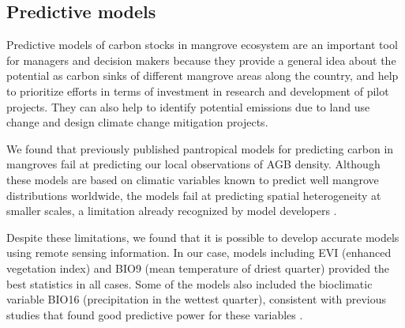 \documentclass[review, authoryear]{elsarticle}   	%
\begin{document}
\subsection{Predictive models}
Predictive models of carbon stocks in mangrove ecosystem are an important tool for managers and decision makers because they provide a general idea about the potential as carbon sinks of different mangrove areas along the country, and help to prioritize efforts in terms of investment in research and development of pilot projects. They can also help to identify potential emissions due to land use change and design climate change mitigation projects. 

We found that previously published pantropical models for predicting carbon in mangroves fail at predicting our local observations of AGB density. Although these models are based on climatic variables known to predict well mangrove distributions worldwide, the models fail at predicting spatial heterogeneity at smaller scales, a limitation already recognized by model developers  \citep{CONL:CONL12060}.


Despite these limitations, we found that it is possible to develop accurate models using remote sensing information. In our case, models including EVI (enhanced vegetation index) and BIO9 (mean temperature of driest quarter) provided the best statistics in all cases. Some of the models also included the bioclimatic variable BIO16 (precipitation in the wettest quarter), consistent with previous studies that found good predictive power for these variables \citep{CONL:CONL12060, Herz1999, Anaya2009}.

\end{document}
